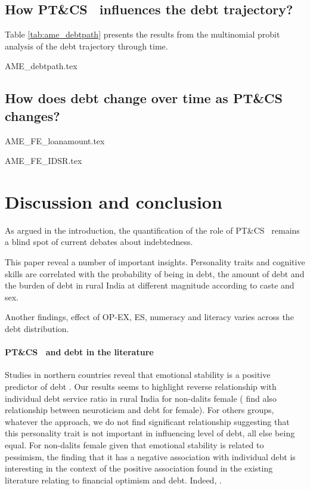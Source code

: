 \documentclass[a4paper, 11pt, onecolumn]{article}
\newcommand{\aebe}{all else being equal}
\newcommand{\PTCS}{PT\&CS}
\begin{document}
\subsection{How \PTCS~ influences the debt trajectory?}
 Table \ref{tab:ame_debtpath} presents the results from the multinomial probit analysis of the debt trajectory through time.
 
{AME_debtpath.tex}



\subsection{How does debt change over time as \PTCS~ changes?}

{AME_FE_loanamount.tex}

{AME_FE_IDSR.tex}





\clearpage
\newpage
\section{Discussion and conclusion}

As argued in the introduction, the quantification of the role of \PTCS~ remains a blind spot of current debates about indebtedness.


This paper reveal a number of important insights.
Personality traits and cognitive skills are correlated with the probability of being in debt, the amount of debt and the burden of debt in rural India at different magnitude according to caste and sex.


Another findings, effect of OP-EX, ES, numeracy and literacy varies across the debt distribution.

\paragraph{\PTCS~ and debt in the literature}
Studies in northern countries reveal that emotional stability is a positive predictor of debt \citep{Nyhus2001}.
Our results seems to highlight reverse relationship with individual debt service ratio in rural India for non-dalits female (\citealp{Brown2014} find also relationship between neuroticism and debt for female).
For others groups, whatever the approach, we do not find significant relationship suggesting that this personality trait is not important in influencing level of debt, \aebe.
For non-dalits female given that emotional stability is related to pessimism, the finding that it has a negative association with individual debt is interesting in the context of the positive association found in the existing literature relating to financial optimism and debt.
Indeed, .
\end{document}

